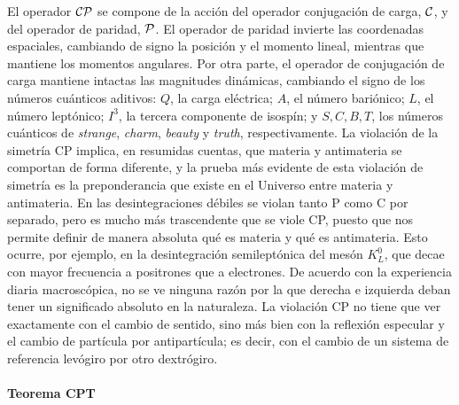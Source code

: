 El operador $\mathcal{CP}$ se compone de la acción del operador conjugación de carga, $\mathcal{C}$, y del operador de paridad, $\mathcal{P}$.
El operador de paridad invierte las coordenadas espaciales, cambiando de signo la posición y el momento lineal, mientras que mantiene los momentos angulares. Por otra parte, el operador de conjugación de carga mantiene intactas las magnitudes dinámicas, cambiando el signo de los números  cuánticos aditivos: $ Q$, la carga eléctrica; $A$, el número  bariónico; $ L$, el número  leptónico; $I^3$, la tercera componente de  isospín; y $ S, C, B, T$, los números cuánticos de \textit{strange}, \textit{charm}, \textit{beauty} y \textit{truth}, respectivamente.
%
La violación de la  simetría CP implica, en resumidas cuentas, que materia y  antimateria se comportan de forma diferente, y la prueba más evidente de esta violación de  simetría es la preponderancia que existe en el Universo entre materia y  antimateria. En las desintegraciones débiles se violan tanto P como C por separado, pero es mucho más trascendente que  se viole CP, puesto que nos permite definir de manera absoluta qué es materia y qué es  antimateria. Esto ocurre, por ejemplo, en la desintegración  semileptónica del mesón $ K_L^0$, que decae con mayor frecuencia a  positrones que a electrones. 
%
De acuerdo con la experiencia diaria  macroscópica, no se ve ninguna razón por la que derecha e izquierda deban tener un significado absoluto en la naturaleza. La violación CP no tiene que ver exactamente con el cambio de sentido, sino más bien con la reflexión especular y el cambio de partícula por  antipartícula; es decir, con el cambio de un sistema de referencia  levógiro por otro  dextrógiro.%



\paragraph{Teorema CPT}

